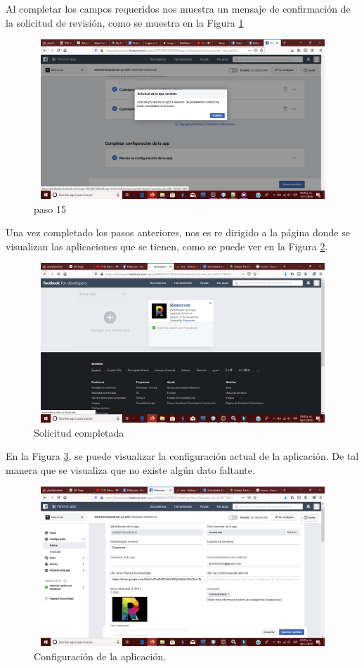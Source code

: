 	\noindent Al completar los campos requeridos nos muestra un mensaje de confirmación de la solicitud de revisión, como se muestra en la Figura \ref{creacionFB15}
\pagebreak
	\begin{figure}[hbt!]
		\centering
		\includegraphics[width=15cm, height=6cm]{Imagenes/FacebookAPI/Facebook15}
		\caption{paso 15}
		\label{creacionFB15}
	\end{figure}

	\noindent Una vez completado los pasos anteriores, nos es re dirigido a la página donde se visualizan las aplicaciones que se tienen, como se puede ver en la Figura \ref{creacionFB6}.
	\begin{figure}[hbt!]
		\centering
		\includegraphics[width=15cm, height=6cm]{Imagenes/FacebookAPI/Facebook6}
		\caption{Solicitud completada}
		\label{creacionFB6}
	\end{figure}
	
	\noindent En la Figura \ref{creacionFB8}, se puede visualizar la configuración actual de la aplicación. De tal manera que se visualiza que no existe algún dato faltante.

	\begin{figure}[hbt!]
		\centering
		\includegraphics[width=15cm, height=6cm]{Imagenes/FacebookAPI/Facebook8}
		\caption{Configuración de la aplicación.}
		\label{creacionFB8}
	\end{figure}
\pagebreak
	
